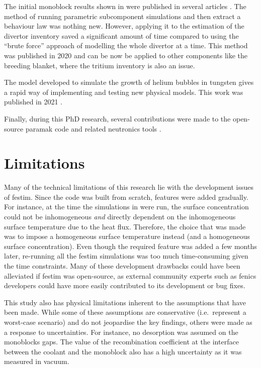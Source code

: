 The initial monoblock results shown in  were published in several articles \cite{delaporte-mathurin_finite_2019, delaporte-mathurin_parametric_2021, delaporte-mathurin_influence_2021-1}.
The method of running parametric subcomponent simulations and then extract a behaviour law was nothing new.
However, applying it to the estimation of the \gls{divertor} inventory saved a significant amount of time compared to using the ``brute force'' approach of modelling the whole \gls{divertor} at a time.
This method was published in 2020 \cite{delaporte-mathurin_parametric_2020} and can be now be applied to other components like the \gls{breeding blanket}, where the tritium inventory is also an issue.

The model developed to simulate the growth of helium bubbles in tungsten gives a rapid way of implementing and testing new physical models.
This work was published in 2021 \cite{delaporte-mathurin_influence_2021}.

Finally, during this PhD research, several contributions were made to the open-source \gls{paramak} code and related neutronics tools \cite{shimwell_paramak_2021}.

\section*{Limitations}

Many of the technical limitations of this research lie with the development issues of \gls{festim}.
Since the code was built from scratch, features were added gradually.
For instance, at the time the simulations in  were run, the surface concentration could not be inhomogeneous \emph{and} directly dependent on the inhomogeneous surface temperature due to the heat flux.
Therefore, the choice that was made was to impose a homogeneous surface temperature instead (and a homogeneous surface concentration).
Even though the required feature was added a few months later, re-running all the \gls{festim} simulations was too much time-consuming given the time constraints.
Many of these development drawbacks could have been alleviated if \gls{festim} was open-source, as external community experts such as \gls{fenics} developers could have more easily contributed to its development or bug fixes.

This study also has physical limitations inherent to the assumptions that have been made.
While some of these assumptions are conservative (i.e.\ represent a worst-case scenario) and do not jeopardise the key findings, others were made as a response to uncertainties.
For instance, no desorption was assumed on the monoblocks gaps.
The value of the recombination coefficient at the interface between the coolant and the monoblock also has a high uncertainty as it was measured in vacuum.


